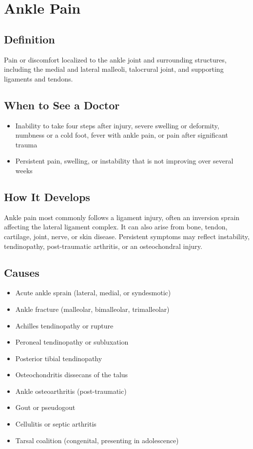 \chapter{Ankle Pain}

\section*{Definition}
Pain or discomfort localized to the ankle joint and surrounding structures, including the medial and lateral malleoli, talocrural joint, and supporting ligaments and tendons.

\section*{When to See a Doctor}

\begin{itemize}
 \item Inability to take four steps after injury, severe swelling or deformity, numbness or a cold foot, fever with ankle pain, or pain after significant trauma
 \item Persistent pain, swelling, or instability that is not improving over several weeks
\end{itemize}

\section*{How It Develops}
Ankle pain most commonly follows a ligament injury, often an inversion sprain affecting the lateral ligament complex. It can also arise from bone, tendon, cartilage, joint, nerve, or skin disease. Persistent symptoms may reflect instability, tendinopathy, post-traumatic arthritis, or an osteochondral injury.

\section*{Causes}
\begin{itemize}
 \item Acute ankle sprain (lateral, medial, or syndesmotic)
 \item Ankle fracture (malleolar, bimalleolar, trimalleolar)
 \item Achilles tendinopathy or rupture
 \item Peroneal tendinopathy or subluxation
 \item Posterior tibial tendinopathy
 \item Osteochondritis dissecans of the talus
 \item Ankle osteoarthritis (post-traumatic)
 \item Gout or pseudogout
 \item Cellulitis or septic arthritis
 \item Tarsal coalition (congenital, presenting in adolescence)
\end{itemize}

